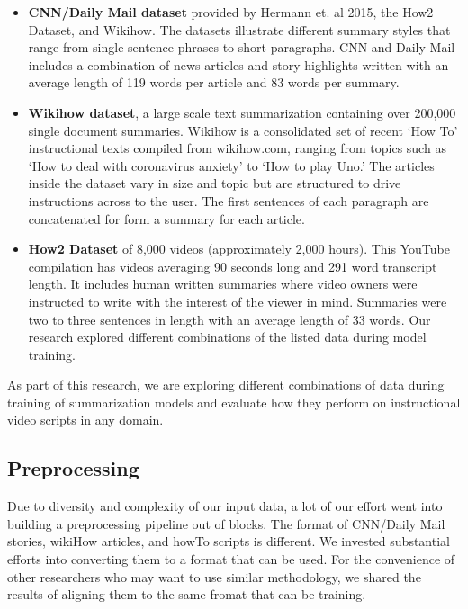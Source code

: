 \documentclass{article}
\begin{document}
\begin{itemize}

\item \textbf{CNN/Daily Mail dataset} provided by Hermann et. al 2015, the How2 Dataset, and Wikihow. The datasets illustrate different summary styles that range from single sentence phrases to short paragraphs. CNN and Daily Mail includes a combination of news articles and story highlights written with an average length of 119 words per article and 83 words per summary.
\item \textbf{Wikihow dataset}, a large scale text summarization containing over 200,000 single document summaries. Wikihow is a consolidated set of recent ‘How To’ instructional texts compiled from wikihow.com, ranging from topics such as ‘How to deal with coronavirus anxiety’ to ‘How to play Uno.’ The articles inside the dataset vary in size and topic but are structured to drive instructions across to the user. The first sentences of each paragraph are concatenated for form a summary for each article. 
\item \textbf{How2 Dataset} of 8,000 videos (approximately 2,000 hours). This YouTube compilation has videos averaging 90 seconds long and 291 word transcript length. It includes human written summaries where video owners were instructed to write with the interest of the viewer in mind. Summaries were two to three sentences in length with an average length of 33 words. 
Our research explored different combinations of the listed data during model training. 

\end{itemize}

As part of this research, we are exploring different combinations of data during training of summarization models and evaluate how they perform on  instructional video scripts in any domain.  

\subsection{Preprocessing}
\label{Preprocessing}

Due to diversity and complexity of our input data, a lot of our effort went into building a preprocessing pipeline out of blocks. The format of CNN/Daily Mail stories, wikiHow articles, and howTo scripts is different. We invested substantial efforts into converting them to a format that can be used. For the convenience of other researchers who may want to use similar methodology, we shared the results of aligning them to the same fromat that can be training. 
\end{document}
